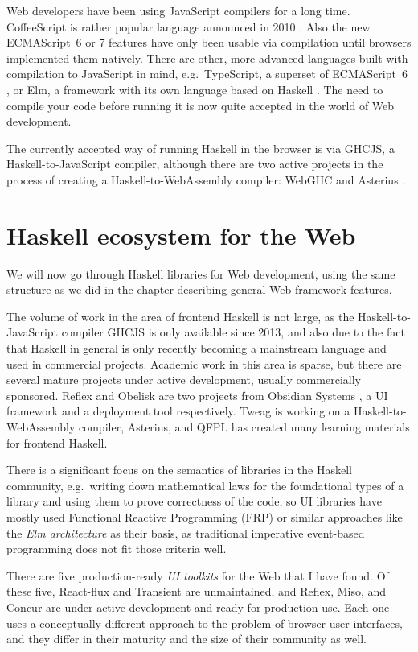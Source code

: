 \documentclass[english,zadani,odsaz]{fitthesis}
\begin{document}
Web developers have been using JavaScript compilers for a long time.
CoffeeScript is rather popular language announced in 2010
\cite{coffeescript}. Also the new ECMAScript~6 or 7 features have only been
usable via compilation until browsers implemented them natively. There are
other, more advanced languages built with compilation to JavaScript in mind,
e.g.~TypeScript, a superset of ECMAScript~6 \cite{typescript}, or Elm,
a framework with its own language based on Haskell \cite{czaplicki2012elm}. The
need to compile your code before running it is now quite accepted in the world
of Web development.

The currently accepted way of running Haskell in the browser is via GHCJS, a
Haskell-to-JavaScript compiler, although there are two active projects in the
process of creating a Haskell-to-WebAssembly compiler: WebGHC \cite{webghc} and
Asterius \cite{asterius}.

\section{Haskell ecosystem for the Web}
\label{sec:org476ce47}
We will now go through Haskell libraries for Web development, using the same
structure as we did in the chapter describing general Web framework features.

The volume of work in the area of frontend Haskell is not large, as the
Haskell-to-JavaScript compiler GHCJS is only available since 2013, and also due
to the fact that Haskell in general is only recently becoming a mainstream
language and used in commercial projects. Academic work in this area is sparse,
but there are several mature projects under active development, usually
commercially sponsored. Reflex and Obelisk are two projects from Obsidian
Systems \cite{obsidian}, a UI framework and a deployment tool respectively. Tweag
\cite{tweag} is working on a Haskell-to-WebAssembly compiler, Asterius, and QFPL
\cite{qfpl} has created many learning materials for frontend Haskell.

There is a significant focus on the semantics of libraries in the Haskell
community, e.g.~writing down mathematical laws for the foundational types of a
library and using them to prove correctness of the code, so UI libraries have
mostly used Functional Reactive Programming (FRP) or similar approaches like
the \emph{Elm architecture} \cite{loder2018web} as their basis, as traditional
imperative event-based programming does not fit those criteria well.

There are five production-ready \emph{UI toolkits} for the Web that I have found. Of
these five, React-flux and Transient are unmaintained, and Reflex, Miso, and
Concur are under active development and ready for production use. Each one uses
a conceptually different approach to the problem of browser user interfaces, and
they differ in their maturity and the size of their community as well.
\end{document}
